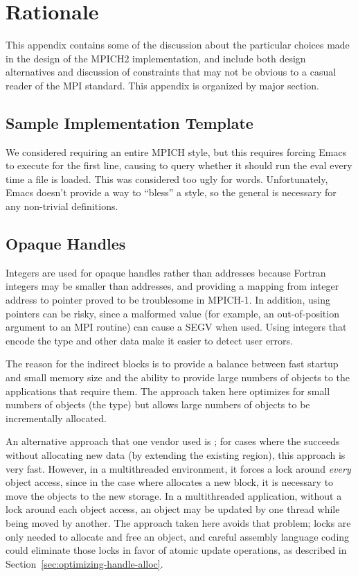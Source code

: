 \documentclass{article}
\begin{document}
\ifrationale
\section{Rationale}
\label{sec:rationale}

This appendix contains some of the discussion about the particular choices
made in the design of the MPICH2 implementation, and include both design
alternatives and discussion of constraints that may not be obvious to a casual
reader of the MPI standard.  This appendix is organized by major section.

\subsection{Sample Implementation Template}

We considered requiring an entire MPICH style, but this requires
forcing Emacs to execute 
 for the first line, causing  to query whether
it should run the eval every time a file is loaded.  This was
considered too ugly for words.  Unfortunately, Emacs doesn't provide a
way to ``bless'' a style, so the general   is necessary for
any non-trivial definitions.

\subsection{Opaque Handles}
\label{sec:rationale-opaque-handles}

Integers are used for opaque handles rather than addresses because
Fortran integers may be smaller than addresses, and providing a
mapping from integer address to pointer proved to be troublesome in
MPICH-1.  In addition, using pointers can be risky, since a malformed
value (for example, an out-of-position argument to an MPI routine) can
cause a SEGV when used.  Using integers that encode the type and other
data make it easier to detect user errors.

The reason for the indirect blocks is to provide a balance between fast
startup and small memory size and the ability to provide large numbers of
objects to the applications that require them.  The approach taken here
optimizes for small numbers of objects (the  type) but
allows large numbers of objects to be incrementally allocated.

An alternative approach that one vendor used is ; for cases
where the  succeeds without allocating new data (by extending
the existing region), this approach is very fast.  However, in a multithreaded
environment, it forces a lock around \emph{every} object access, since in the
case where  allocates a new block, it is necessary to move the
objects to the new storage.  In a multithreaded application, without a lock
around each object access, an object may be updated by one thread while being
moved by another.  The approach taken here avoids that problem; locks are only
needed to allocate and free an object, and careful assembly language coding
could eliminate those locks in favor of atomic update operations, as
described in Section~\ref{sec:optimizing-handle-alloc}.
\end{document}
